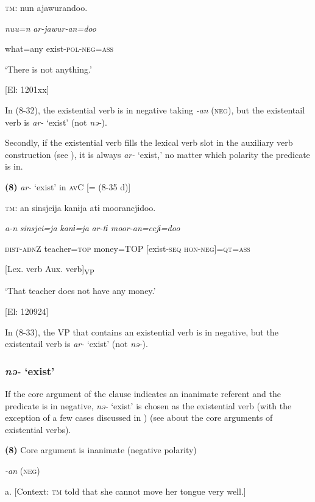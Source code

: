   \textsc{tm}:  nun  ajawurandoo.

    \textit{nuu=n}  \textit{ar-jawur-an=doo}

    what=any  exist-\textsc{pol}-\textsc{neg}=\textsc{ass}

    ‘There is not anything.’

    [El: 1201xx]

In (8-32), the existential verb is in negative taking \textit{{}-an} (\textsc{neg}), but the existentail verb is \textit{ar-} ‘exist’ (not \textit{nə-}).

  Secondly, if the existential verb fills the lexical verb slot in the auxiliary verb construction (see ), it is always \textit{ar-} ‘exist,’ no matter which polarity the predicate is in.

\textbf{(8)}  \textit{ar-} ‘exist’ in \textsc{av}C [= (8-35 d)]

  \textsc{tm}:  an  sinsjeija  kanɨja  atɨ  moorancjɨdoo.

    \textit{a-n}  \textit{sinsjei=ja}  \textit{kanɨ=ja}  \textit{ar-tɨ}  \textit{moor-an=ccjɨ=doo}

    \textsc{dist}-\textsc{adn}Z  teacher=\textsc{top}  money=TOP  [exist-\textsc{seq}  \textsc{hon}-\textsc{neg}]=\textsc{qt}=\textsc{ass}

          [Lex. verb  Aux. verb]\textsubscript{VP}

    ‘That teacher does not have any money.’

    [El: 120924]

In (8-33), the VP that contains an existential verb is in negative, but the existentail verb is \textit{ar-} ‘exist’ (not \textit{nə-}).

\subsubsection{\textit{nə-} ‘exist’}

If the core argument of the clause indicates an inanimate referent and the predicate is in negative, \textit{nə-} ‘exist’ is chosen as the existential verb (with the exception of a few cases discussed in ) (see  about the core arguments of existential verbs).

\textbf{(8)}  Core argument is inanimate (negative polarity)

  \textit{{}-an} (\textsc{neg})

  a.  [Context: \textsc{tm} told that she cannot move her tongue very well.]

